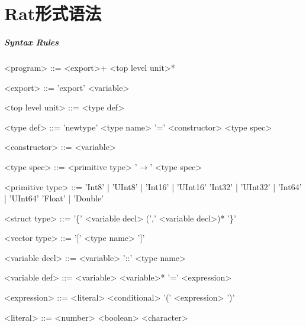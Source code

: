 \chapter{Rat形式语法}

\setlength{\grammarindent}{10em}
\setlength{\grammarparsep}{5pt}
\paragraph{Syntax Rules}
\begin{grammar}
<program>        ::=    <export>+ <top level unit>*

<export>         ::=    'export' <variable>

<top level unit> ::=    <type def>

<type def>       ::=    'newtype' <type name> '=' <constructor> <type spec>

<constructor>    ::=    <variable>

<type spec>      ::=    <primitive type>
                  '$\to$' <type spec>

<primitive type> ::=    'Int8' | 'UInt8' | 'Int16' | 'UInt16' \alt 'Int32' | 'UInt32' | 'Int64' | 'UInt64'
                 \alt     'Float' | 'Double'

<struct type>    ::=    '\{' <variable decl> (',' <variable decl>)* '\}'

<vector type>    ::=    '[' <type name> ']'

<variable decl>  ::=    <variable> '::' <type name>

<variable def>   ::=    <variable> <variable>* '=' <expression>

<expression>     ::=    <literal>
                 \alt     <conditional>
                 \alt     '(' <expression> ')'

<literal>        ::=    <number>
                 \alt     <boolean>
                 \alt     <character>


\end{grammar}
